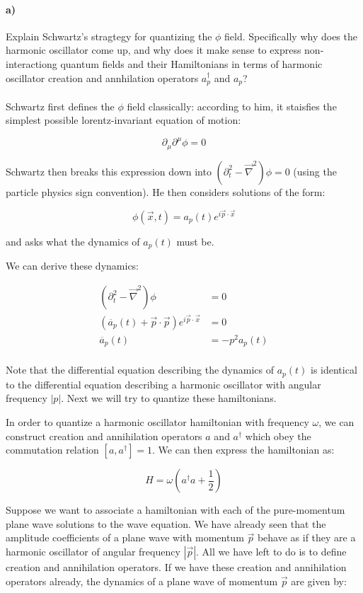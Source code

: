 \documentclass{article}
\begin{document}
\paragraph{a)}
Explain Schwartz's stragtegy for quantizing the $\phi$ field.
Specifically why does the harmonic oscillator come up, and why does it make 
	sense to express non-interactiong quantum fields and their Hamiltonians
	in terms of harmonic oscillator creation and annhilation operators 
	$a_p^{\dagger}$ and $a_p$?


\paragraph{}
Schwartz first defines the $\phi$ field classically: according to him, it staisfies 
	the simplest possible lorentz-invariant equation of motion:

\[ \partial_\mu \partial^\mu \phi = 0 \]

Schwartz then breaks this expression down into 
	$ \left( \partial_t^2 - \vec{\nabla}^2 \right) \phi = 0$
	(using the particle physics sign convention).
He then considers solutions of the form:

\[ \phi( \vec{x}, t ) = a_p(t) e^{i \vec{p} \cdot \vec{x}} \]

	and asks what the dynamics of $a_p(t)$ must be.

We can derive these dynamics:

\begin{align*}
\left( \partial_t^2 - \vec{\nabla}^2 \right) \phi & = 0\\
\left( \ddot{a_p}(t) + \vec{p} \cdot \vec{p} \right) e^{i \vec{p} \cdot \vec{x}} & = 0\\
\ddot{a_p}(t) & = - p^2 a_p(t) \\
\end{align*}

Note that the differential equation describing the dynamics of $a_p(t)$ is 
	identical to the differential equation describing a harmonic oscillator with
	angular frequency $ \left| p \right|$.
Next we will try to quantize these hamiltonians.

In order to quantize a harmonic oscillator hamiltonian with frequency $\omega$, we can 
	construct creation and annihilation operators $a$ and $a^\dagger$ 
	which obey the commutation relation $[a, a^\dagger] = 1$.
We can then express the hamiltonian as:

\[ H = \omega \left( a^\dagger a + \frac{1}{2} \right) \]

Suppose we want to associate a hamiltonian with each of the pure-momentum plane wave
	solutions to the wave equation.
We have already seen that the amplitude coefficients of a plane wave with momentum $\vec{p}$
	behave as if they are a harmonic oscillator of angular frequency $\left| \vec{p} \right|$.
All we have left to do is to define creation and annihilation operators.
If we have these creation and annihilation operators already, the dynamics of a plane wave
	of momentum $\vec{p}$ are given by:
\end{document}
